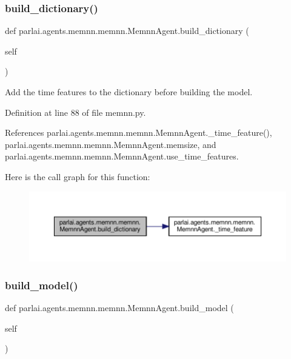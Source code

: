 \subsubsection{\texorpdfstring{build\+\_\+dictionary()}{build\_dictionary()}}
{\footnotesize\ttfamily def parlai.\+agents.\+memnn.\+memnn.\+Memnn\+Agent.\+build\+\_\+dictionary (\begin{DoxyParamCaption}\item[{}]{self }\end{DoxyParamCaption})}

\begin{DoxyVerb}Add the time features to the dictionary before building the model.\end{DoxyVerb}
 

Definition at line 88 of file memnn.\+py.



References parlai.\+agents.\+memnn.\+memnn.\+Memnn\+Agent.\+\_\+time\+\_\+feature(), parlai.\+agents.\+memnn.\+memnn.\+Memnn\+Agent.\+memsize, and parlai.\+agents.\+memnn.\+memnn.\+Memnn\+Agent.\+use\+\_\+time\+\_\+features.

Here is the call graph for this function\+:
\nopagebreak
\begin{figure}[H]
\begin{center}
\leavevmode
\includegraphics[width=350pt]{classparlai_1_1agents_1_1memnn_1_1memnn_1_1MemnnAgent_af314871636896b61139ef761765a1872_cgraph}
\end{center}
\end{figure}
\mbox{\label{classparlai_1_1agents_1_1memnn_1_1memnn_1_1MemnnAgent_aa5b5782548443a008c0502ec9ddedee2}} 
\subsubsection{\texorpdfstring{build\+\_\+model()}{build\_model()}}
{\footnotesize\ttfamily def parlai.\+agents.\+memnn.\+memnn.\+Memnn\+Agent.\+build\+\_\+model (\begin{DoxyParamCaption}\item[{}]{self }\end{DoxyParamCaption})}

